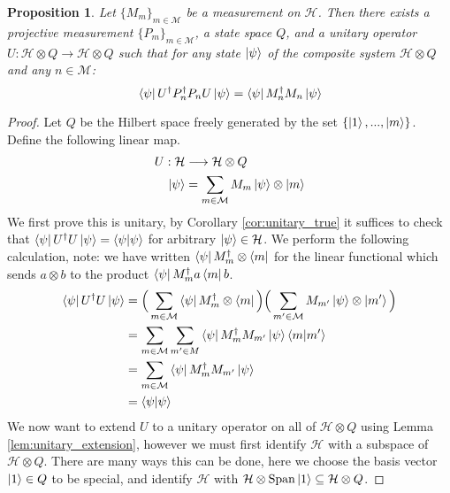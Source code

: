 \documentclass[12pt]{article}
\theoremstyle{plain}
\newtheorem{proposition}[thm]{Proposition}
\theoremstyle{definition}
\newcommand{\call}[1]{\mathcal{#1}}
\newcommand{\lto}{\longrightarrow}
\begin{document}
	\begin{proposition}\label{prop:projective_vs_measurement}
		Let $\lbrace M_m\rbrace_{m \in \call{M}}$ be a measurement on $\call{H}$. Then there exists a projective measurement $\{ P_m \}_{m \in \call{M}}$, a state space $Q$, and a unitary operator $U: \call{H} \otimes Q \lto \call{H} \otimes Q$ such that for any state $\ket{\psi}$ of the composite system $\call{H} \otimes Q$ and any $n \in \call{M}$:
		\begin{equation}
			\bra{\psi} U^\dagger P_n^\dagger P_n U\ket{\psi} = \bra{\psi} M_n^\dagger M_n \ket{\psi}
			\end{equation}
	\end{proposition}
	\begin{proof}
		Let $Q$ be the Hilbert space freely generated by the set $\lbrace \ket{1},...,\ket{m}\rbrace$. Define the following linear map.
		\begin{align}
			\label{eq:measurement}U: \call{H} &\lto \call{H} \otimes Q\\
			\label{eq:measurement_equation}\ket{\psi} &= \sum_{m \in \call{M}}M_m\ket{\psi}\otimes \ket{m}
		\end{align}
		We first prove this is unitary, by Corollary \ref{cor:unitary_true} it suffices to check that $\bra{\psi}U^\dagger U\ket{\psi} = \bra{\psi}\ket{\psi}$ for arbitrary $\ket{\psi} \in \call{H}$. We perform the following calculation, note: we have written $\bra{\psi} M_m^\dagger \otimes \bra{m}$ for the linear functional which sends $a \otimes b$ to the product $\bra{\psi} M_m^\dagger a \bra{m}b$.
		\begin{align*}
			\bra{\psi}U^\dagger U\ket{\psi} &= \Big(\sum_{m \in \call{M}}\bra{\psi}M_m^\dagger \otimes \bra{m}\Big)\Big(\sum_{m' \in \call{M}}M_{m'}\ket{\psi} \otimes \ket{m'}\Big)\\
			&= \sum_{m \in \call{M}}\sum_{m' \in M}\bra{\psi}M_m^\dagger M_{m'}\ket{\psi}\bra{m}\ket{m'}\\
			&= \sum_{m \in \call{M}}\bra{\psi}M_m^\dagger M_{m'}\ket{\psi}\\
			&= \bra{\psi}\ket{\psi}
		\end{align*}
		We now want to extend $U$ to a unitary operator on all of $\call{H} \otimes Q$ using Lemma \ref{lem:unitary_extension}, however we must first identify $\call{H}$ with a subspace of $\call{H} \otimes Q$. There are many ways this can be done, here we choose the basis vector $\ket{1} \in Q$ to be special, and identify $\call{H}$ with $\call{H} \otimes \operatorname{Span}\ket{1} \subseteq \call{H} \otimes Q$.
		

\end{proof}
\end{document}
